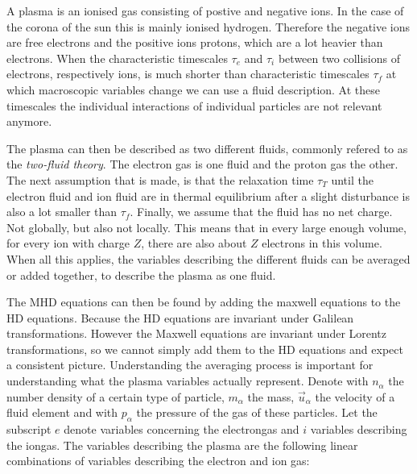 A plasma is an ionised gas consisting of postive and negative ions. In the case of the corona of the sun this is mainly ionised hydrogen.
Therefore the negative ions are free electrons and the positive ions protons, which are a lot heavier than electrons.
When the characteristic timescales $\tau_e$ and $\tau_i$ between two collisions of electrons, respectively ions, is much shorter than characteristic timescales $\tau_f$ at which macroscopic variables change we can use a fluid description. 
At these timescales the individual interactions of individual particles are not relevant anymore.

The plasma can then be described as two different fluids, commonly refered to as the \emph{two-fluid theory}.
The electron gas is one fluid and the proton gas the other. 
The next assumption that is made, is that the relaxation time $\tau_T$ until the electron fluid and ion fluid are in thermal equilibrium after a slight disturbance is also a lot smaller than $\tau_f$.
Finally, we assume that the fluid has no net charge. Not globally, but also not locally. 
This means that in every large enough volume, for every ion with charge $Z$, there are also about $Z$ electrons in this volume.
When all this applies, the variables describing the different fluids can be averaged or added together, to describe the plasma as one fluid.

The MHD equations can then be found by adding the maxwell equations to the HD equations. Because the HD equations are invariant under Galilean transformations. 
However the Maxwell equations are invariant under Lorentz transformations, so we cannot simply add them to the HD equations and expect a consistent picture. 
Understanding the averaging process is important for understanding what the plasma variables actually represent.
Denote with $n_\alpha$ the number density of a certain type of particle, $m_\alpha$ the mass, $\vec{u}_\alpha$ the velocity of a fluid element and with $p_\alpha$ the pressure of the gas of these particles. 
Let the subscript $e$ denote variables concerning the electrongas and $i$ variables describing the iongas.
The variables describing the plasma are the following linear combinations of variables describing the electron and ion gas:

{\centering 
\noindent {}
\par}


